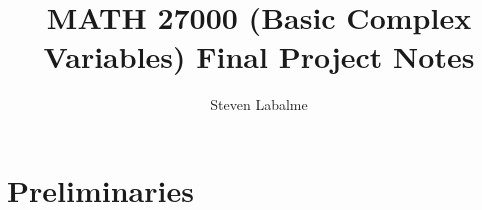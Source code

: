 \documentclass[titlepage]{article}
\title{MATH 27000 (Basic Complex Variables) Final Project Notes}
\author{Steven Labalme}
\begin{document}
\maketitle



\tableofcontents
\newpage



\pagestyle{empty}
\part{Preliminaries}
\newpage

\pagestyle{main}
\renewcommand{\leftmark}{Final Project Proposal Form}
\renewcommand{\proofname}{Answer}

\renewcommand{\proofname}{Proof}
\end{document}
